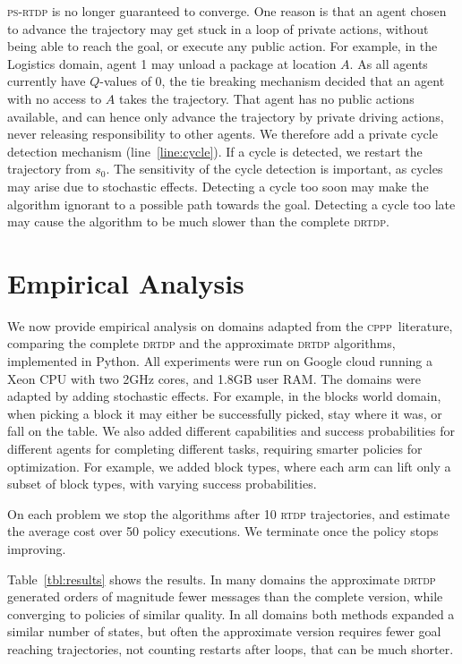 \documentclass[letterpaper]{article} %
\newcommand{\cppp}{\textsc {cppp}\xspace}
\newcommand{\rtdp}{\textsc {rtdp}\xspace}
\newcommand{\drtdp}{\textsc {drtdp}\xspace}
\newcommand{\psrtdp}{\textsc{ps}-\textsc{rtdp}\xspace}
\theoremstyle{remark}
\begin{document}
\psrtdp is no longer guaranteed to converge. One reason is that an agent chosen to advance the trajectory may get stuck in a loop of private actions, without being able to reach the goal, or execute any public action. For example, in the Logistics domain, agent 1 may unload a package at location $A$. As all agents currently have  $Q$-values of 0, the tie breaking mechanism decided that an agent with no access to $A$ takes the trajectory. That agent has no public actions available, and can hence only advance the trajectory by private driving actions, never releasing responsibility to other agents.
We therefore add a private cycle detection mechanism (line~\ref{line:cycle}). If a cycle is detected, we restart the trajectory from $s_0$. The sensitivity of the cycle detection is important, as cycles may arise due to stochastic effects. Detecting a cycle too soon may make the algorithm ignorant to a possible path towards the goal. Detecting a cycle too late may cause the algorithm to be much slower than the complete \drtdp.


\vspace{-1.79mm}
\section{Empirical Analysis}



We now provide empirical analysis on domains adapted from the \cppp\ literature, comparing the complete \drtdp and the approximate \drtdp algorithms, implemented in Python. All experiments were run on Google cloud running a Xeon CPU with two 2GHz cores, and 1.8GB user RAM.
The domains were adapted by adding stochastic effects. For example, in the blocks world domain, when picking a block it may either be successfully picked, stay where it was, or fall on the table. We also added different capabilities and success probabilities for different agents for completing different tasks, requiring smarter policies for optimization. For example, we added block types, where each arm can lift only a subset of block types, with varying success probabilities.

\vspace{-31.48mm}
On each problem we stop the algorithms after 10 \rtdp trajectories, and estimate the average cost over 50 policy executions. We terminate once the policy stops improving.

Table~\ref{tbl:results} shows the results. In many domains the approximate \drtdp generated orders of magnitude fewer messages than the complete version, while converging to policies of similar quality. In all domains both methods expanded a similar number of states, but often the approximate version requires fewer goal reaching trajectories, not counting restarts after loops, that can be much shorter.
\end{document}
